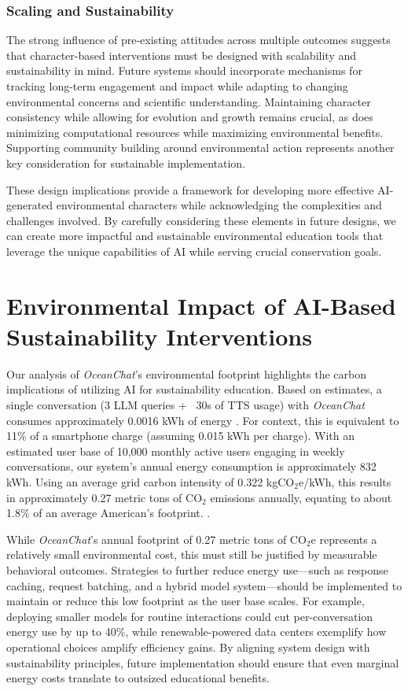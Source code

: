 \documentclass[sigconf, nonacm]{acmart}
\begin{document}
\subsubsection*{Scaling and Sustainability}
The strong influence of pre-existing attitudes across multiple outcomes suggests that character-based interventions must be designed with scalability and sustainability in mind. Future systems should incorporate mechanisms for tracking long-term engagement and impact while adapting to changing environmental concerns and scientific understanding. Maintaining character consistency while allowing for evolution and growth remains crucial, as does minimizing computational resources while maximizing environmental benefits. Supporting community building around environmental action represents another key consideration for sustainable implementation.

These design implications provide a framework for developing more effective AI-generated environmental characters while acknowledging the complexities and challenges involved. By carefully considering these elements in future designs, we can create more impactful and sustainable environmental education tools that leverage the unique capabilities of AI while serving crucial conservation goals.

\section*{Environmental Impact of AI-Based Sustainability Interventions}
Our analysis of \textit{OceanChat}’s environmental footprint highlights the carbon implications of utilizing AI for sustainability education. Based on estimates, a single conversation (3 LLM queries + ~30s of TTS usage) with \textit{OceanChat} consumes approximately 0.0016 kWh of energy \cite{baeldung2024chatgpt, Aramon2024}. For context, this is equivalent to 11\% of a smartphone charge (assuming 0.015 kWh per charge). With an estimated user base of 10,000 monthly active users engaging in weekly conversations, our system’s annual energy consumption is approximately 832 kWh. Using an average grid carbon intensity of 0.322 kgCO$_2$e/kWh, this results in approximately 0.27 metric tons of CO$_2$ emissions annually, equating to about 1.8\% of an average American's footprint. \cite{epa2023, iea2023}.

While \textit{OceanChat}’s annual footprint of 0.27 metric tons of CO$_2$e represents a relatively small environmental cost, this must still be justified by measurable behavioral outcomes. Strategies to further reduce energy use—such as response caching, request batching, and a hybrid model system—should be implemented to maintain or reduce this low footprint as the user base scales. For example, deploying smaller models for routine interactions could cut per-conversation energy use by up to 40\%, while renewable-powered data centers exemplify how operational choices amplify efficiency gains. By aligning system design with sustainability principles, future implementation should ensure that even marginal energy costs translate to outsized educational benefits.
\end{document}
